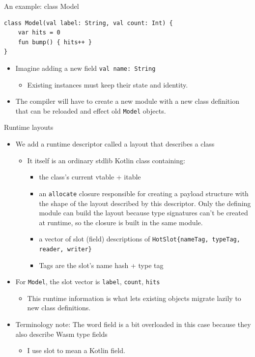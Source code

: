 \documentclass[10pt,presentation]{beamer}
\begin{document}
\begin{frame}[label={sec:orgccf1a3d},fragile]{An example: class Model}
 \begin{verbatim}
class Model(val label: String, val count: Int) {
    var hits = 0
    fun bump() { hits++ }
}
\end{verbatim}

\begin{itemize}
\item Imagine adding a new field \texttt{val name: String}
\begin{itemize}
\item Existing instances \alert{must} keep their state and identity.
\end{itemize}
\item The compiler will have to create a new module with a new class
definition that can be reloaded and effect old \texttt{Model} objects.
\end{itemize}
\end{frame}
\begin{frame}[label={sec:orgde831bf},fragile]{Runtime layouts}
 \begin{itemize}
\item We add a runtime descriptor called a layout that describes a class
\begin{itemize}
\item It itself is an ordinary stdlib Kotlin class containing:
\begin{itemize}
\item the class's current vtable + itable
\item an \texttt{allocate} closure responsible for creating a payload
structure with the shape of the layout described by this
descriptor. Only the defining module can build the layout
because type signatures can't be created at runtime, so the
closure is built in the same module.
\item a vector of slot (field) descriptions of \texttt{HotSlot\{nameTag,
      typeTag, reader, writer\}}
\item Tags are the slot's name hash + type tag
\end{itemize}
\end{itemize}
\item For \texttt{Model}, the slot vector is \texttt{label}, \texttt{count}, \texttt{hits}
\begin{itemize}
\item This runtime information is what lets existing objects migrate
lazily to new class definitions.
\end{itemize}
\item Terminology note: The word field is a bit overloaded in this case
because they also describe Wasm type fields
\begin{itemize}
\item I use slot to mean a Kotlin field.
\end{itemize}
\end{itemize}
\end{frame}
\end{document}
